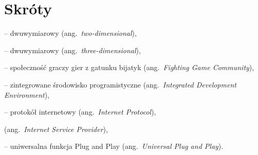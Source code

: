 % 
\chapter*{Skróty}
\label{sec:skroty}
\noindent\vspace{-\topsep-\partopsep-\parsep} 
\begin{description}[labelwidth=*]
  \item [2D] -- dwuwymiarowy (ang.\ \emph{two-dimensional}),
	\item [3D] -- dwuwymiarowy (ang.\ \emph{three-dimensional}), 
	\item [FGC] -- społeczność graczy gier z gatunku bijatyk (ang.~\emph{Fighting Game Community}),
	\item [IDE] -- zintegrowane środowisko programistyczne (ang.~\emph{Integrated Development Environment}),
	\item [IP] -- protokół internetowy (ang.~\emph{Internet Protocol}),
	\item [ISP] (ang.~\emph{Internet Service Provider}),
  \item [UPnP] -- uniwersalna funkcja Plug and Play (ang.~\emph{Universal Plug and Play}).
	
\end{description}
